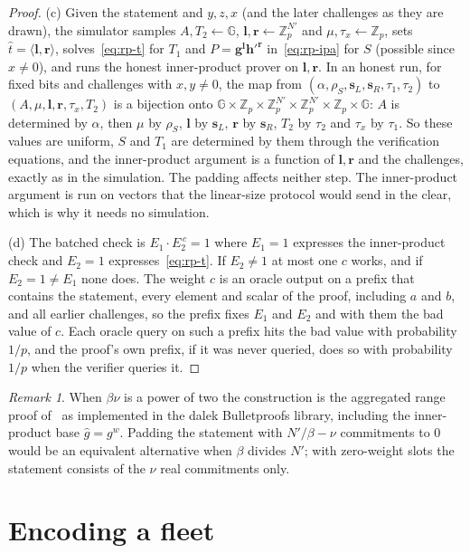 \documentclass[11pt]{article}
\theoremstyle{definition}
\theoremstyle{remark}
\newtheorem{remark}[lemma]{Remark}
\newcommand{\Z}{\mathbb{Z}}
\newcommand{\G}{\mathbb{G}}
\newcommand{\bv}{\mathbf}
\begin{document}
\begin{proof}
(c) Given the statement and $y,z,x$ (and the later challenges as they are drawn), the simulator samples $A,T_2\gets\G$, $\bv l,\bv r\gets\Z_p^{N'}$ and $\mu,\tau_x\gets\Z_p$, sets $\hat t=\langle\bv l,\bv r\rangle$, solves~\eqref{eq:rp-t} for $T_1$ and $P=\bv g^{\bv l}\bv h'^{\bv r}$ in~\eqref{eq:rp-ipa} for $S$ (possible since $x\ne0$), and runs the honest inner-product prover on $\bv l,\bv r$. In an honest run, for fixed bits and challenges with $x,y\ne0$, the map from $(\alpha,\rho_S,\bv s_L,\bv s_R,\tau_1,\tau_2)$ to $(A,\mu,\bv l,\bv r,\tau_x,T_2)$ is a bijection onto $\G\times\Z_p\times\Z_p^{N'}\times\Z_p^{N'}\times\Z_p\times\G$: $A$ is determined by $\alpha$, then $\mu$ by $\rho_S$, $\bv l$ by $\bv s_L$, $\bv r$ by $\bv s_R$, $T_2$ by $\tau_2$ and $\tau_x$ by $\tau_1$. So these values are uniform, $S$ and $T_1$ are determined by them through the verification equations, and the inner-product argument is a function of $\bv l,\bv r$ and the challenges, exactly as in the simulation. The padding affects neither step. The inner-product argument is run on vectors that the linear-size protocol would send in the clear, which is why it needs no simulation.

(d) The batched check is $E_1\cdot E_2^{\,c}=1$ where $E_1=1$ expresses the inner-product check and $E_2=1$ expresses~\eqref{eq:rp-t}. If $E_2\ne1$ at most one $c$ works, and if $E_2=1\ne E_1$ none does. The weight $c$ is an oracle output on a prefix that contains the statement, every element and scalar of the proof, including $a$ and $b$, and all earlier challenges, so the prefix fixes $E_1$ and $E_2$ and with them the bad value of $c$. Each oracle query on such a prefix hits the bad value with probability $1/p$, and the proof's own prefix, if it was never queried, does so with probability $1/p$ when the verifier queries it.
\end{proof}

\begin{remark}
When $\beta\nu$ is a power of two the construction is the aggregated range proof of~\cite{bulletproofs} as implemented in the dalek Bulletproofs library, including the inner-product base $\hat g=g^w$. Padding the statement with $N'/\beta-\nu$ commitments to $0$ would be an equivalent alternative when $\beta$ divides $N'$; with zero-weight slots the statement consists of the $\nu$ real commitments only.
\end{remark}

\section{Encoding a fleet}\label{sec:encoding}
\end{document}
